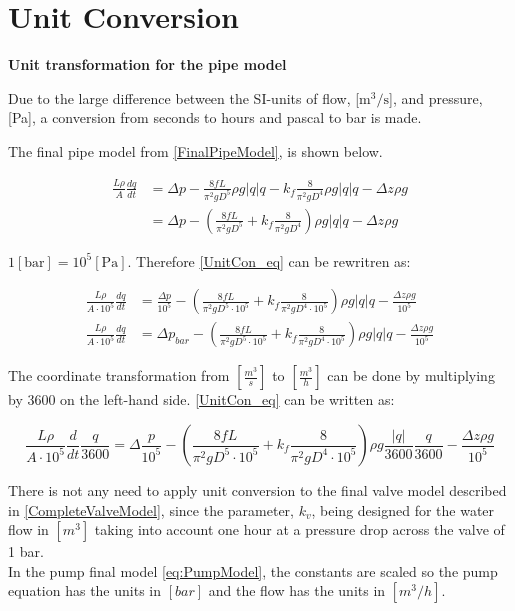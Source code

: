 \chapter{Unit Conversion}
\label{unitCON}
\textbf{Unit transformation for the pipe model}

Due to the large difference between the SI-units of flow, [$\text{m}^3/\text{s}$], and pressure, [Pa], a conversion from seconds to hours and pascal to bar is made.

The final pipe model from \eqref{FinalPipeModel}, is shown below.   

\begin{equation}
\begin{split}
   \frac{L \rho}{A} \frac{dq}{dt} &=\Delta p - \frac{8fL}{\pi^{2}gD^5} \rho g  |q| q - k_f \frac{8}{\pi^2gD^4} \rho g |q| q - \Delta z \rho g \\
   &=\Delta p - (\frac{8fL}{\pi^{2}gD^5} + k_f \frac{8}{\pi^2gD^4}) \rho g |q| q - \Delta z \rho g
\end{split}
\label{UnitCon_eq}
\end{equation}

$1 [\text{bar}] = 10^5[\text{Pa}]$. Therefore \eqref{UnitCon_eq} can be rewritren as: 

\begin{equation}
\begin{split}
   \frac{L \rho}{A\cdot10^5} \frac{dq}{dt} &=  \frac{\Delta p}{10^5} - (\frac{8fL}{\pi^{2}gD^5\cdot10^5} + k_f \frac{8}{\pi^2gD^4\cdot10^5}) \rho g |q| q - \frac{\Delta z \rho g}{10^5}\\
   \frac{L \rho}{A\cdot10^5} \frac{dq}{dt} &= \Delta p_{bar} - (\frac{8fL}{\pi^{2}gD^5\cdot10^5} + k_f \frac{8}{\pi^2gD^4\cdot10^5}) \rho g |q| q - \frac{\Delta z \rho g}{10^5}
\end{split}
\end{equation}

The coordinate transformation from $[\frac{m^3}{s}]$ to $[\frac{m^3}{h}]$ can be done by multiplying by 3600 on the left-hand side. \eqref{UnitCon_eq} can be written as:

\begin{equation}
   \frac{L \rho}{A\cdot10^5} \frac{d}{dt}\frac{q}{3600} = \Delta \frac{p}{10^5} - (\frac{8fL}{\pi^{2}gD^5\cdot10^5} + k_f \frac{8}{\pi^2gD^4\cdot10^5}) \rho g \frac{|q|}{3600} \frac{q}{3600} - \frac{\Delta z \rho g}{10^5}
\end{equation}

There is not any need to apply unit conversion to the final valve model described in \eqref{CompleteValveModel}, since the parameter, $k_v$, being designed for the water flow in $[m^3]$ taking into account one hour at a pressure drop across the valve of 1 bar. 
\\
In the pump final model \eqref{eq:PumpModel}, the constants are scaled so the pump equation has the units in $[bar]$ and the flow has the units in $[m^3/h]$.

